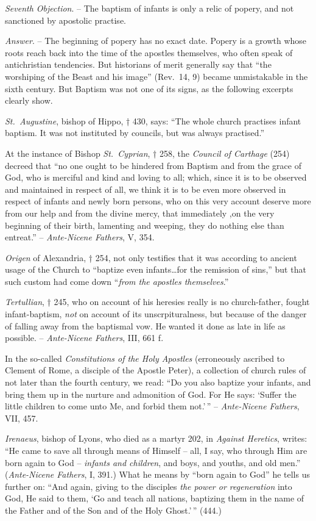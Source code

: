 \documentclass[
]{book}
\begin{document}
\emph{Seventh Objection}. -- The baptism of infants is only a relic of popery, and not sanctioned by apostolic practise.

\emph{Answer}. -- The beginning of popery has no exact date. Popery is a growth whose roots reach back into the time of the apostles themselves, who often speak of antichristian tendencies. But historians of merit generally say that ``the worshiping of the Beast and his image'' (Rev.~14, 9) became unmistakable in the sixth century. But Baptism was not one of its signs, as the following excerpts clearly show.

\emph{St.~Augustine}, bishop of Hippo, † 430, says: ``The whole church practises infant baptism. It was not instituted by councils, but was always practised.''

At the instance of Bishop \emph{St.~Cyprian}, † 258, the \emph{Council of Carthage} (254) decreed that ``no one ought to be hindered from Baptism and from the grace of God, who is merciful and kind and loving to all; which, since it is to be observed and maintained in respect of all, we think it is to be even more observed in respect of infants and newly born persons, who on this very account deserve more from our help and from the divine mercy, that immediately ,on the very beginning of their birth, lamenting and weeping, they do nothing else than entreat.'' -- \emph{Ante-Nicene Fathers}, V, 354.

\emph{Origen} of Alexandria, † 254, not only testifies that it was according to ancient usage of the Church to ``baptize even infants\ldots for the remission of sins,'' but that such custom had come down ``\emph{from the apostles themselves}.''

\emph{Tertullian}, † 245, who on account of his heresies really is no church-father, fought infant-baptism, \emph{not} on account of its unscrpituralness, but because of the danger of falling away from the baptismal vow. He wanted it done as late in life as possible. -- \emph{Ante-Nicene Fathers}, III, 661 f.

In the so-called \emph{Constitutions of the Holy Apostles} (erroneously ascribed to Clement of Rome, a disciple of the Apostle Peter), a collection of church rules of not later than the fourth century, we read: ``Do you also baptize your infants, and bring them up in the nurture and admonition of God. For He says: `Suffer the little children to come unto Me, and forbid them not.'\,'' -- \emph{Ante-Nicene Fathers}, VII, 457.

\emph{Irenaeus}, bishop of Lyons, who died as a martyr 202, in \emph{Against Heretics}, writes: ``He came to save all through means of Himself -- all, I say, who through Him are born again to God -- \emph{infants and children}, and boys, and youths, and old men.'' (\emph{Ante-Nicene Fathers}, I, 391.) What he means by ``born again to God'' he tells us further on: ``And again, giving to the disciples \emph{the power or regeneration} into God, He said to them, `Go and teach all nations, baptizing them in the name of the Father and of the Son and of the Holy Ghost.'\,'' (444.)
\end{document}
